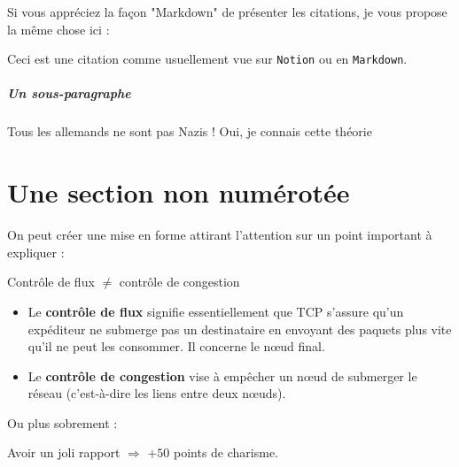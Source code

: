 Si vous appréciez la façon "Markdown" de présenter les citations, je vous propose la même chose ici :
\begin{quoted}
    Ceci est une citation comme usuellement vue sur \texttt{Notion} ou en \texttt{Markdown}.
\end{quoted}

\subparagraph{Un sous-paragraphe}

\begin{dialogue}
      Tous les allemands ne sont pas Nazis !
     Oui, je connais cette théorie
\end{dialogue}

\section*{Une section non numérotée}
On peut créer une mise en forme attirant l'attention sur un point important à expliquer :

\begin{callout}{Contrôle de flux $\neq$ contrôle de congestion}
    \begin{itemize}
        \item Le \textbf{contrôle de flux} signifie essentiellement que TCP s'assure qu'un expéditeur ne submerge pas un destinataire en envoyant des paquets plus vite qu'il ne peut les consommer. Il concerne le nœud final.
        \item Le \textbf{contrôle de congestion} vise à empêcher un nœud de submerger le réseau (c'est-à-dire les liens entre deux nœuds).
    \end{itemize}
\end{callout}

Ou plus sobrement :

\begin{myboxedtext}
    Avoir un joli rapport $\Rightarrow$ $+50$ points de charisme.
\end{myboxedtext}